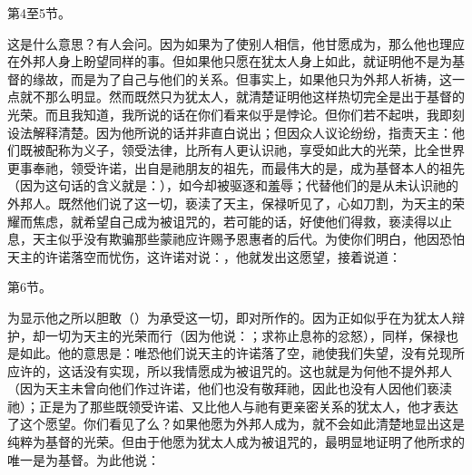 第4至5节。\par

这是什么意思？有人会问。因为如果为了使别人相信，他甘愿成为，那么他也理应在外邦人身上盼望同样的事。但如果他只愿在犹太人身上如此，就证明他不是为基督的缘故，而是为了自己与他们的关系。但事实上，如果他只为外邦人祈祷，这一点就不那么明显。然而既然只为犹太人，就清楚证明他这样热切完全是出于基督的光荣。而且我知道，我所说的话在你们看来似乎是悖论。但你们若不起哄，我即刻设法解释清楚。因为他所说的话并非直白说出；但因众人议论纷纷，指责天主：他们既被配称为义子，领受法律，比所有人更认识祂，享受如此大的光荣，比全世界更事奉祂，领受许诺，出自是祂朋友的祖先，而最伟大的是，成为基督本人的祖先（因为这句话的含义就是：），如今却被驱逐和羞辱；代替他们的是从未认识祂的外邦人。既然他们说了这一切，亵渎了天主，保禄听见了，心如刀割，为天主的荣耀而焦虑，就希望自己成为被诅咒的，若可能的话，好使他们得救，亵渎得以止息，天主似乎没有欺骗那些蒙祂应许赐予恩惠者的后代。为使你们明白，他因恐怕天主的许诺落空而忧伤，这许诺对说：，他就发出这愿望，接着说道：\par

第6节。\par

为显示他之所以胆敢（）为承受这一切，即对所作的。因为正如似乎在为犹太人辩护，却一切为天主的光荣而行（因为他说：；求祢止息祢的忿怒），同样，保禄也是如此。他的意思是：唯恐他们说天主的许诺落了空，祂使我们失望，没有兑现所应许的，这话没有实现，所以我情愿成为被诅咒的。这也就是为何他不提外邦人（因为天主未曾向他们作过许诺，他们也没有敬拜祂，因此也没有人因他们亵渎祂）；正是为了那些既领受许诺、又比他人与祂有更亲密关系的犹太人，他才表达了这个愿望。你们看见了么？如果他愿为外邦人成为，就不会如此清楚地显出这是纯粹为基督的光荣。但由于他愿为犹太人成为被诅咒的，最明显地证明了他所求的唯一是为基督。为此他说：\par

\par

